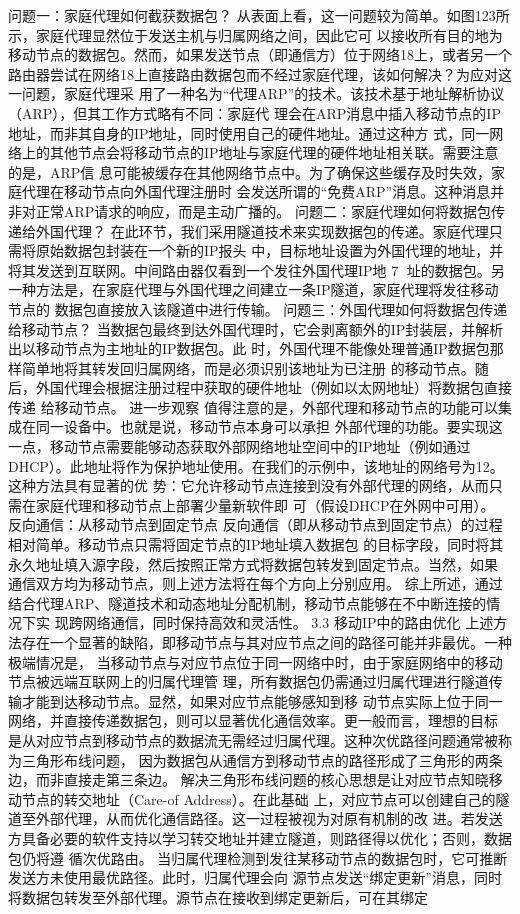 问题一：家庭代理如何截获数据包？
从表面上看，这一问题较为简单。如图123所示，家庭代理显然位于发送主机与归属网络之间，因此它可
以接收所有目的地为移动节点的数据包。然而，如果发送节点（即通信方）位于网络18上，或者另一个
路由器尝试在网络18上直接路由数据包而不经过家庭代理，该如何解决？为应对这一问题，家庭代理采
用了一种名为“代理ARP”的技术。该技术基于地址解析协议（ARP），但其工作方式略有不同：家庭代
理会在ARP消息中插入移动节点的IP地址，而非其自身的IP地址，同时使用自己的硬件地址。通过这种方
式，同一网络上的其他节点会将移动节点的IP地址与家庭代理的硬件地址相关联。需要注意的是，ARP信
息可能被缓存在其他网络节点中。为了确保这些缓存及时失效，家庭代理在移动节点向外国代理注册时
会发送所谓的“免费ARP”消息。这种消息并非对正常ARP请求的响应，而是主动广播的。
问题二：家庭代理如何将数据包传递给外国代理？
在此环节，我们采用隧道技术来实现数据包的传递。家庭代理只需将原始数据包封装在一个新的IP报头
中，目标地址设置为外国代理的地址，并将其发送到互联网。中间路由器仅看到一个发往外国代理IP地
                                                 7
址的数据包。另一种方法是，在家庭代理与外国代理之间建立一条IP隧道，家庭代理将发往移动节点的
数据包直接放入该隧道中进行传输。
问题三：外国代理如何将数据包传递给移动节点？
当数据包最终到达外国代理时，它会剥离额外的IP封装层，并解析出以移动节点为主地址的IP数据包。此
时，外国代理不能像处理普通IP数据包那样简单地将其转发回归属网络，而是必须识别该地址为已注册
的移动节点。随后，外国代理会根据注册过程中获取的硬件地址（例如以太网地址）将数据包直接传递
给移动节点。
进一步观察
值得注意的是，外部代理和移动节点的功能可以集成在同一设备中。也就是说，移动节点本身可以承担
外部代理的功能。要实现这一点，移动节点需要能够动态获取外部网络地址空间中的IP地址（例如通过
DHCP）。此地址将作为保护地址使用。在我们的示例中，该地址的网络号为12。这种方法具有显著的优
势：它允许移动节点连接到没有外部代理的网络，从而只需在家庭代理和移动节点上部署少量新软件即
可（假设DHCP在外网中可用）。
反向通信：从移动节点到固定节点
反向通信（即从移动节点到固定节点）的过程相对简单。移动节点只需将固定节点的IP地址填入数据包
的目标字段，同时将其永久地址填入源字段，然后按照正常方式将数据包转发到固定节点。当然，如果
通信双方均为移动节点，则上述方法将在每个方向上分别应用。
综上所述，通过结合代理ARP、隧道技术和动态地址分配机制，移动节点能够在不中断连接的情况下实
现跨网络通信，同时保持高效和灵活性。
3.3 移动IP中的路由优化
上述方法存在一个显著的缺陷，即移动节点与其对应节点之间的路径可能并非最优。一种极端情况是，
当移动节点与对应节点位于同一网络中时，由于家庭网络中的移动节点被远端互联网上的归属代理管
理，所有数据包仍需通过归属代理进行隧道传输才能到达移动节点。显然，如果对应节点能够感知到移
动节点实际上位于同一网络，并直接传递数据包，则可以显著优化通信效率。更一般而言，理想的目标
是从对应节点到移动节点的数据流无需经过归属代理。这种次优路径问题通常被称为三角形布线问题，
因为数据包从通信方到移动节点的路径形成了三角形的两条边，而非直接走第三条边。
解决三角形布线问题的核心思想是让对应节点知晓移动节点的转交地址（Care-of Address）。在此基础
上，对应节点可以创建自己的隧道至外部代理，从而优化通信路径。这一过程被视为对原有机制的改
进。若发送方具备必要的软件支持以学习转交地址并建立隧道，则路径得以优化；否则，数据包仍将遵
循次优路由。
当归属代理检测到发往某移动节点的数据包时，它可推断发送方未使用最优路径。此时，归属代理会向
源节点发送“绑定更新”消息，同时将数据包转发至外部代理。源节点在接收到绑定更新后，可在其绑定


